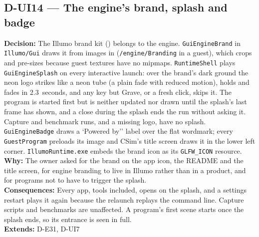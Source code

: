 \subsection*{D-UI14 --- The engine's brand, splash and badge}
\begin{decisionbox}[title={D-UI14 \quad 2026-09-27}]
\textbf{Decision:} The Illumo brand kit () belongs to the
engine. \texttt{GuiEngineBrand} in \texttt{Illumo/Gui} draws it from images in
 (\texttt{/engine/Branding} in a guest), which
 crops and pre-sizes because guest textures
have no mipmaps. \texttt{RuntimeShell} plays \texttt{GuiEngineSplash} on every
interactive launch: over the brand's dark ground the neon logo strikes like a
neon tube (a plain fade with reduced motion), holds and fades in 2.3~seconds,
and any key but Grave, or a fresh click, skips it. The program is started
first but is neither updated nor drawn until the splash's last frame has
shown, and a close during the splash ends the run without asking it. Capture
and benchmark runs, and a missing logo, have no splash.
\texttt{GuiEngineBadge} draws a `Powered by'' label over the flat wordmark;
every \texttt{GuestProgram} preloads its image and CSim's title screen draws it
in the lower left corner. \texttt{IllumoRuntime.exe} embeds the brand icon as
its \texttt{GLFW\_ICON} resource.\\
\textbf{Why:} The owner asked for the brand on the app icon, the README and
the title screen, for engine branding to live in Illumo rather than in a
product, and for programs not to have to trigger the splash.\\
\textbf{Consequences:} Every app, tools included, opens on the splash, and a
settings restart plays it again because the relaunch replays the command line.
Capture scripts and benchmarks are unaffected. A program's first scene starts
once the splash ends, so its entrance is seen in full.\\
\textbf{Extends:} D-E31, D-UI7
\end{decisionbox}

